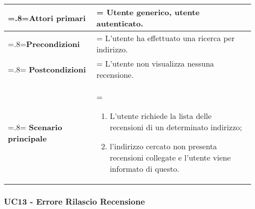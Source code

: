            \begin{center}
                \renewcommand{\arraystretch}{1.5}
                \renewcommand\tabularxcolumn[1]{m{#1}}
                \begin{tabularx}{0.9\textwidth} {
                    >{\hsize=.8\hsize\linewidth=\hsize}X
                    >{\hsize=1.2\hsize\linewidth=\hsize}X}
                    \hline
                    \textbf{Attori primari} & Utente generico, utente autenticato. \\
                    \hline
                    \textbf{Precondizioni} & L'utente ha effettuato una ricerca per indirizzo. \\
                    \hline
                    \textbf{Postcondizioni} & L'utente non visualizza nessuna recensione. \\
                    \hline
                    \textbf{Scenario principale} &
                        \begin{enumerate}
                            \item L'utente richiede la lista delle recensioni di un determinato indirizzo;
                            \item l'indirizzo cercato non presenta recensioni collegate e l'utente viene
                            informato di questo.
                        \end{enumerate} \\
                    \hline
                \end{tabularx}
            \end{center}

        \subsubsection{UC13 - Errore Rilascio Recensione}
        \label{UC13}

